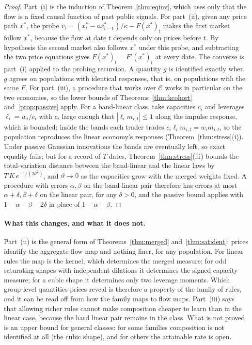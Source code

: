 \documentclass[12pt]{article}
\theoremstyle{definition}
\theoremstyle{remark}
\begin{document}
\begin{proof}
Part~(i) is the induction of Theorem~\ref{thm:eqinv}, which uses only that the flow is a fixed causal function of past public signals. For part~(ii), given any price path $x^*$, the probe $v_t=(x^*_t-ax^*_{t-1})/\kappa-F(x^*)_t$ makes the first market follow $x^*$, because the flow at date $t$ depends only on prices before $t$. By hypothesis the second market also follows $x^*$ under this probe, and subtracting the two price equations gives $F(x^*)_t=F'(x^*)_t$ at every date. The converse is part~(i) applied to the probing recursion. A quantity $g$ is identified exactly when $g$ agrees on populations with identical responses, that is, on populations with the same $F$. For part~(iii), a procedure that works over $\mathcal C$ works in particular on the two economies, so the lower bounds of Theorems~\ref{thm:kcohort} and~\ref{prop:passive} apply. For a band-linear class, take capacities $c_i$ and leverages $\ell_i=w_i/c_i$ with $c_i$ large enough that $|\ell_im_{i,t}|\le1$ along the impulse response, which is bounded; inside the bands each trader trades $c_i\ell_im_{i,t}=w_im_{i,t}$, so the population reproduces the linear economy's responses (Theorem~\ref{thm:stress}(i)). Under passive Gaussian innovations the bands are eventually left, so exact equality fails; but for a record of $T$ dates, Theorem~\ref{thm:stress}(iii) bounds the total-variation distance between the band-linear and the linear laws by $T\,K\,e^{-1/(2\vartheta^2)}$, and $\vartheta\to0$ as the capacities grow with the merged weights fixed. A procedure with errors $\alpha,\beta$ on the band-linear pair therefore has errors at most $\alpha+\delta,\beta+\delta$ on the linear pair, for any $\delta>0$, and the passive bound applies with $1-\alpha-\beta-2\delta$ in place of $1-\alpha-\beta$.
\end{proof}

\paragraph{What this changes, and what it does not.} Part~(ii) is the general form of Theorems~\ref{thm:merged} and~\ref{thm:satident}: prices identify the aggregate flow map and nothing finer, for any population. For linear rules the map is the kernel, which determines the merged measure; for odd saturating shapes with independent dilations it determines the signed capacity measure; for a cubic shape it determines only two leverage moments. Which group-level quantities prices reveal is therefore a property of the family of rules, and it can be read off from how the family maps to flow maps. Part~(iii) says that allowing richer rules cannot make composition cheaper to learn than in the linear case, because the hard linear pair remains in the class. What is not proved is an upper bound for general classes: for some families composition is not identified at all (the cubic shape), and for others the attainable rate is open.
\end{document}
